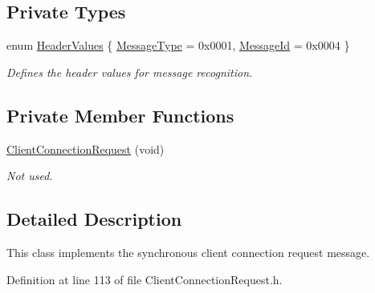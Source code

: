 \subsection*{Private Types}
\begin{DoxyCompactItemize}
\item 
enum \hyperlink{class_terra_swarm_1_1_synchronous_1_1_client_connection_request_aea4a8b2edd6730c9b592394868d059e3}{Header\-Values} \{ \hyperlink{class_terra_swarm_1_1_synchronous_1_1_client_connection_request_aea4a8b2edd6730c9b592394868d059e3abd99d038acc6de976f899ab9fc50595d}{Message\-Type} = 0x0001, 
\hyperlink{class_terra_swarm_1_1_synchronous_1_1_client_connection_request_aea4a8b2edd6730c9b592394868d059e3a53c5286b4426b73ea18df2b4e03948ff}{Message\-Id} = 0x0004
 \}
\begin{DoxyCompactList}\small\item\em Defines the header values for message recognition. \end{DoxyCompactList}\end{DoxyCompactItemize}
\subsection*{Private Member Functions}
\begin{DoxyCompactItemize}
\item 
\hyperlink{class_terra_swarm_1_1_synchronous_1_1_client_connection_request_a807ffa63107a4e1147eebde79ed61f68}{Client\-Connection\-Request} (void)
\begin{DoxyCompactList}\small\item\em Not used. \end{DoxyCompactList}\end{DoxyCompactItemize}


\subsection{Detailed Description}
This class implements the synchronous client connection request message. 

Definition at line 113 of file Client\-Connection\-Request.\-h.



